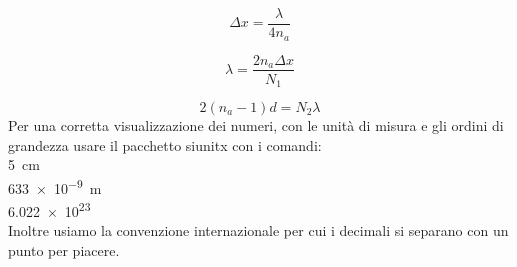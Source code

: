 \documentclass[a4paper,11pt]{article}
\begin{document}
	\label{interf} %
	\label{strum} %
	\label{calib} %
	\label{lambda} %
	
	\begin{equation}\label{delta}
	\Delta x = \dfrac{\lambda}{4n_a}
	\end{equation}
	
	\begin{equation}\label{\lambda}
	\lambda=\dfrac{2n_a\Delta x}{N_1}		
	\end{equation}
	
	\begin{equation}\label{indice_aria}
	2 (n_a - 1) d = N_2 \lambda
	\end{equation}
	Per una corretta visualizzazione dei numeri, con le unità di misura e gli ordini di grandezza usare il pacchetto siunitx con i comandi:\\
	
		\SI{5}{\centi\meter}
	\\
		\SI{633e-9}{\meter}
	\\
		\num{6.022e23}
	\\
	Inoltre usiamo la convenzione internazionale per cui i decimali si separano con un punto per piacere.
	

	
\end{document}
